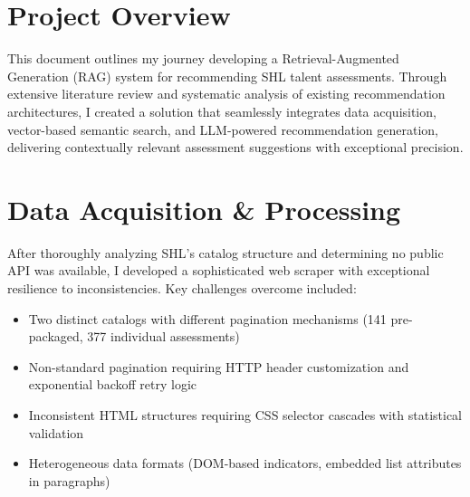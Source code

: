 \documentclass[10pt,a4paper,twocolumn]{article}
\begin{document}

\section*{Project Overview}
\small
This document outlines my journey developing a Retrieval-Augmented Generation (RAG) system for recommending SHL talent assessments. Through extensive literature review and systematic analysis of existing recommendation architectures, I created a solution that seamlessly integrates data acquisition, vector-based semantic search, and LLM-powered recommendation generation, delivering contextually relevant assessment suggestions with exceptional precision.

\section{Data Acquisition \& Processing}
\small
After thoroughly analyzing SHL's catalog structure and determining no public API was available, I developed a sophisticated web scraper with exceptional resilience to inconsistencies. Key challenges overcome included:

\begin{itemize}[leftmargin=*,itemsep=2pt,topsep=0pt,parsep=0pt]
    \item Two distinct catalogs with different pagination mechanisms (141 pre-packaged, 377 individual assessments)
    \item Non-standard pagination requiring HTTP header customization and exponential backoff retry logic
    \item Inconsistent HTML structures requiring CSS selector cascades with statistical validation
    \item Heterogeneous data formats (DOM-based indicators, embedded list attributes in paragraphs)
\end{itemize}
\end{document}
